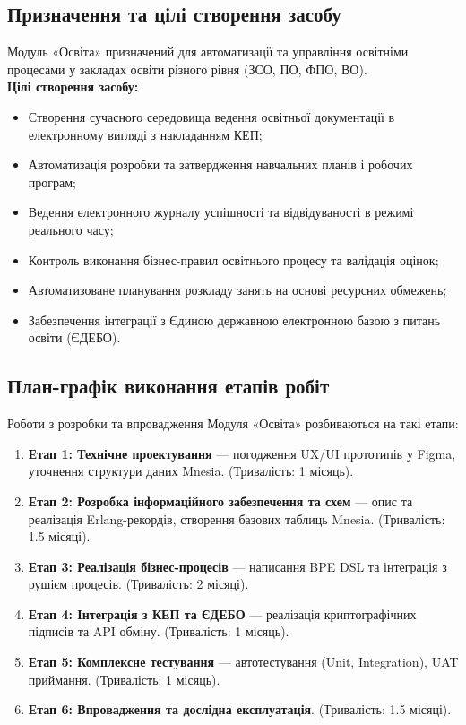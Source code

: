 \documentclass{article}
\begin{document}
\subsection{Призначення та цілі створення засобу}
Модуль «Освіта» призначений для автоматизації та управління освітніми процесами у закладах освіти різного рівня (ЗСО, ПО, ФПО, ВО).
\\
\textbf{Цілі створення засобу:}
\begin{itemize}
    \item Створення сучасного середовища ведення освітньої документації в електронному вигляді з накладанням КЕП;
    \item Автоматизація розробки та затвердження навчальних планів і робочих програм;
    \item Ведення електронного журналу успішності та відвідуваності в режимі реального часу;
    \item Контроль виконання бізнес-правил освітнього процесу та валідація оцінок;
    \item Автоматизоване планування розкладу занять на основі ресурсних обмежень;
    \item Забезпечення інтеграції з Єдиною державною електронною базою з питань освіти (ЄДЕБО).
\end{itemize}

\subsection{План-графік виконання етапів робіт}
Роботи з розробки та впровадження Модуля «Освіта» розбиваються на такі етапи:
\begin{enumerate}
    \item \textbf{Етап 1: Технічне проектування} --- погодження UX/UI прототипів у Figma, уточнення структури даних Mnesia. (Тривалість: 1 місяць).
    \item \textbf{Етап 2: Розробка інформаційного забезпечення та схем} --- опис та реалізація Erlang-рекордів, створення базових таблиць Mnesia. (Тривалість: 1.5 місяці).
    \item \textbf{Етап 3: Реалізація бізнес-процесів} --- написання BPE DSL та інтеграція з рушієм процесів. (Тривалість: 2 місяці).
    \item \textbf{Етап 4: Інтеграція з КЕП та ЄДЕБО} --- реалізація криптографічних підписів та API обміну. (Тривалість: 1 місяць).
    \item \textbf{Етап 5: Комплексне тестування} --- автотестування (Unit, Integration), UAT приймання. (Тривалість: 1 місяць).
    \item \textbf{Етап 6: Впровадження та дослідна експлуатація}. (Тривалість: 1.5 місяці).
\end{enumerate}
\end{document}
